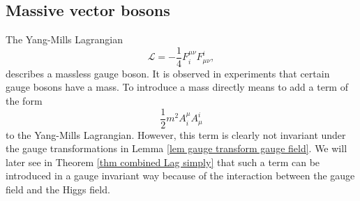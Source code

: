 \documentclass[12pt]{amsart}
\theoremstyle{definition}
\theoremstyle{remark}
\numberwithin{equation}{section}
\begin{document}
\subsection{Massive vector bosons}
The Yang-Mills Lagrangian
\begin{equation*}
\mathcal{L}=-\frac{1}{4}F^{\mu\nu}_iF_{\mu\nu}^i,
\end{equation*}
describes a massless gauge boson. It is observed in experiments that certain gauge bosons have a mass. To introduce a mass directly means to add a term of the form
\begin{equation*}
\frac{1}{2}m^2A^\mu_iA_\mu^i
\end{equation*}
to the Yang-Mills Lagrangian. However, this term is clearly not invariant under the gauge transformations in Lemma \ref{lem gauge transform gauge field}. We will later see in Theorem \ref{thm combined Lag simply} that such a term can be introduced in a gauge invariant way because of the interaction between the gauge field and the Higgs field.
\end{document}

